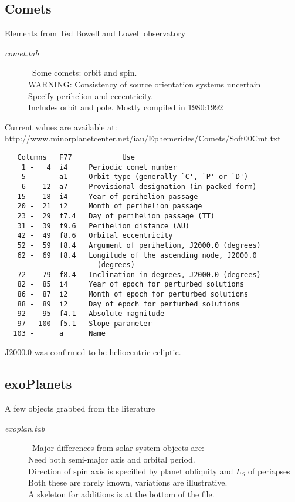 \documentclass{article}
\newcommand{\qi}{\\ \hspace*{2.em}}      %
\newcommand{\qiii}{\\ \hspace*{6.em}}    %
\begin{document}
\subsection{Comets}
Elements from Ted Bowell and Lowell observatory
\begin{description} 
 \item [\textit{comet.tab}] \  Some comets: orbit and spin. 
\\ WARNING: Consistency of source orientation systems uncertain
\qi Specify perihelion and eccentricity.
\\ Includes orbit and pole. Mostly compiled in 1980:1992
\end{description}
Current values are available at: 
\qi http://www.minorplanetcenter.net/iau/Ephemerides/Comets/Soft00Cmt.txt
\vspace{-6.mm}
\begin{verbatim}
   Columns   F77            Use
    1 -   4  i4     Periodic comet number
    5        a1     Orbit type (generally `C', `P' or `D')
    6 -  12  a7     Provisional designation (in packed form)
   15 -  18  i4     Year of perihelion passage
   20 -  21  i2     Month of perihelion passage
   23 -  29  f7.4   Day of perihelion passage (TT)
   31 -  39  f9.6   Perihelion distance (AU)
   42 -  49  f8.6   Orbital eccentricity
   52 -  59  f8.4   Argument of perihelion, J2000.0 (degrees)
   62 -  69  f8.4   Longitude of the ascending node, J2000.0
                      (degrees)
   72 -  79  f8.4   Inclination in degrees, J2000.0 (degrees)
   82 -  85  i4     Year of epoch for perturbed solutions
   86 -  87  i2     Month of epoch for perturbed solutions
   88 -  89  i2     Day of epoch for perturbed solutions
   92 -  95  f4.1   Absolute magnitude
   97 - 100  f5.1   Slope parameter
  103 -      a      Name
\end{verbatim}
J2000.0 was confirmed to be heliocentric ecliptic.

\subsection{exoPlanets} %
 A few objects grabbed from the literature
\begin{description} 
\item [\textit{exoplan.tab}] \ Major differences from solar system objects are:
\qi Need both semi-major axis and orbital period.
\qi Direction of spin axis is specified by planet obliquity and $L_S$ of periapses
\qiii Both these are rarely known, variations are illustrative.
\qi A skeleton for additions is at the bottom of the file.
\end{description}
\end{document}
